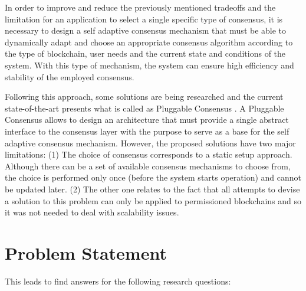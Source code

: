 In order to improve and reduce the previously mentioned tradeoffs and the limitation for an application to select a single specific type of consensus, it is necessary to design a self adaptive consensus mechanism that must be able to dynamically adapt and choose an appropriate consensus algorithm according to the type of blockchain, user needs and the current state and conditions of the system. With this type of mechanism, the system can ensure high efficiency and stability of the employed consensus.

Following this approach, some solutions are being researched and the current state-of-the-art presents what is called as Pluggable Consensus \cite{dynamic_reconfiguration_consensus_IoT, research_self_adaptive_consensus}. A Pluggable Consensus allows to design an architecture that must provide a single abstract interface to the consensus layer with the purpose to serve as a base for the self adaptive consensus mechanism. However, the proposed solutions have two major limitations: (1) The choice of consensus corresponds to a static setup approach. Although there can be a set of available consensus mechanisms to choose from, the choice is performed only once (before the system starts operation) and cannot be updated later. (2) The other one relates to the fact that all attempts to devise a solution to this problem can only be applied to permissioned blockchains and so it was not needed to deal with scalability issues.




\section{Problem Statement}
\label{sub:intro-problem}


This leads to find answers for the following research questions:



